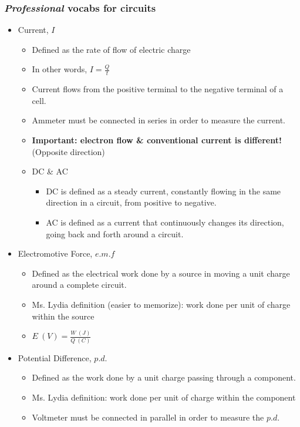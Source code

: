 \documentclass[a4paper,12pt]{article}
\begin{document}
\subsubsection{\textit{Professional} vocabs for circuits}
\begin{itemize}
    \item Current, \(I\)
    \begin{itemize}
        \item Defined as the rate of flow of electric charge
        \item In other words, \(I=\frac{Q}{t}\)
        \item Current flows from the positive terminal to the negative terminal of a cell.
        \item Ammeter must be connected in series in order to measure the current. 
        \item \textbf{Important: electron flow \& conventional current is different!} (Opposite direction)
        \item DC \& AC
        \begin{itemize}
            \item DC is defined as a steady current, constantly flowing in the same direction in a circuit, from positive to negative.
            \item AC is defined as a current that continuously changes its direction, going back and forth around a circuit.
        \end{itemize}
    \end{itemize}
    \item Electromotive Force, \(e.m.f\)
    \begin{itemize}
        \item Defined as the electrical work done by a source in moving a unit charge around a complete circuit.
        \item Ms. Lydia definition (easier to memorize): work done per unit of charge within the source
        \item \(E\ (V) = \frac{W\ (J)}{Q\ (C)}\)
    \end{itemize}
    \item Potential Difference, \(p.d.\)
    \begin{itemize}
        \item Defined as the work done by a unit charge passing through a component.
        \item Ms. Lydia definition: work done per unit of charge within the component
        \item Voltmeter must be connected in parallel in order to measure the \(p.d.\)

\end{itemize}
\end{itemize}
\end{document}
